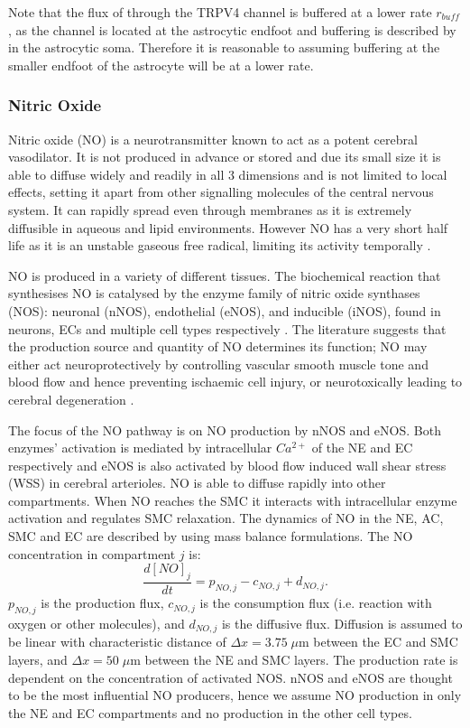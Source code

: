 			Note that the flux of \ca through the TRPV4 channel is buffered at a lower rate $r_{buff}$, as the channel is located at the astrocytic endfoot and buffering is described by \cite{Witthoft2013} in the astrocytic soma. Therefore it is reasonable to assuming buffering at the smaller endfoot of the astrocyte will be at a lower rate. 
	
	\subsubsection{Nitric Oxide}
	
		Nitric oxide (NO) is a neurotransmitter known to act as a potent cerebral vasodilator. It is not produced in advance or stored and due its small size it is able to diffuse widely and readily in all 3 dimensions and is not limited to local effects, setting it apart from other signalling molecules of the central nervous system. It can rapidly spread even through membranes as it is extremely diffusible in aqueous and lipid environments. However NO has a very short half life as it is an unstable gaseous free radical, limiting its activity temporally \citep{Dobutovic2011} . 
					
		NO is produced in a variety of different tissues. The biochemical reaction that synthesises NO is catalysed by the enzyme family of nitric oxide synthases (NOS): neuronal (nNOS), endothelial (eNOS), and inducible (iNOS), found in neurons, ECs and multiple cell types respectively \citep{Forstermann2006}. 
		The literature suggests that the production source and quantity of NO determines its function; NO may either act neuroprotectively by controlling vascular smooth muscle tone and blood flow and hence preventing ischaemic cell injury, or neurotoxically leading to cerebral degeneration \citep{aurelia2010role}.
				
		The focus of the NO pathway is on NO production by nNOS and eNOS. Both enzymes' activation is mediated by intracellular $Ca^{2+}$ of the NE and EC respectively and eNOS is also activated by blood flow induced wall shear stress (WSS) in cerebral arterioles.
		NO is able to diffuse rapidly into other compartments. When NO reaches the SMC it interacts with intracellular enzyme activation and regulates SMC relaxation. 
		The dynamics of NO in the NE, AC, SMC and EC are described by using mass balance formulations. The NO concentration in compartment $j$ is:
			\begin{equation}
			\frac{d[NO]_j}{dt} = p_{NO,j} - c_{NO,j} + d_{NO,j}.
			\end{equation}
		$ p_{NO,j}$ is the production flux,  $c_{NO,j}$ is the consumption flux (i.e. reaction with oxygen or other molecules), and $d_{NO,j}$ is the diffusive flux. Diffusion is assumed to be linear with characteristic distance of $\Delta x = 3.75 \; \mu$m between the EC and SMC layers, and  $\Delta x = 50 \; \mu$m between the NE and SMC layers.
		The production rate is dependent on the concentration of activated NOS. nNOS and eNOS are thought to be the most influential NO producers, hence we assume NO production in only the NE and EC compartments and no production in the other cell types.
		
